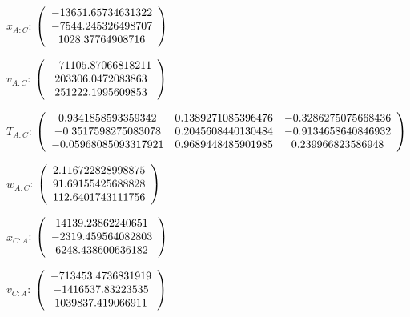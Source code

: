 \begin{description}
$x_{A:C}$: $\left( \begin{array} {ccc} -13651.65734631322 \\    -7544.245326498707 \\      1028.37764908716
\end{array} \right)\\ \\$

$v_{A:C}$:  $\left( \begin{array} {ccc}  -71105.87066818211 \\     203306.0472083863 \\     251222.1995609853
\end{array} \right)\\ \\$

$T_{A:C}$: $\left( \begin{array} {ccc}
0.9341858593359342 &    0.1389271085396476 &   -0.3286275075668436 \\
 -0.3517598275083078 &    0.2045608440130484 &   -0.9134658640846932 \\
 -0.05968085093317921 &    0.9689448485901985 &     0.239966823586948 \\
\end{array} \right)\\ \\$

$w_{A:C}$:  $\left( \begin{array} {ccc}
2.116722828998875 \\     91.69155425688828 \\     112.6401743111756
\end{array} \right)\\ \\$

$x_{C:A}$: $\left( \begin{array} {ccc}  14139.23862240651 \\    -2319.459564082803 \\     6248.438600636182
\end{array} \right)\\ \\$

$v_{C:A}$:  $\left( \begin{array} {ccc}  -713453.4736831919 \\     -1416537.83223535 \\     1039837.419066911
\end{array} \right)\\ \\$


\end{description}
